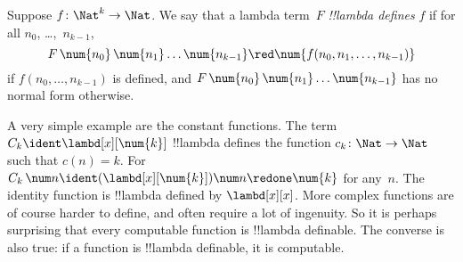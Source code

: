 \documentclass[../../../include/open-logic-section]{subfiles}
\begin{document}
\begin{defn}
Suppose $f\colon \Nat^k \to \Nat$. We say that a lambda term~$F$
\emph{!!{lambda define}s} $f$ if for all 
$n_0$, \dots,~$n_{k-1}$,
\[
F \, \num{n_0} \, \num{n_1} \dots \num{n_{k-1}} \red \num{f(n_0, n_1, \dots,
  n_{k-1})}
\]
if $f(n_0, \dots, n_{k-1})$ is defined, and $F \, \num{n_0} \,
\num{n_1} \dots \num{n_{k-1}}$ has no normal form otherwise.
\end{defn}

A very simple example are the constant functions. The term $C_k \ident
\lambd[x][\num{k}]$ !!{lambda define}s the function $c_k\colon \Nat \to
\Nat$ such that $c(n) = k$. For $C_k \, \num n \ident
(\lambd[x][\num{k}])\num n \redone \num{k}$ for any~$n$. The identity
function is !!{lambda defined} by $\lambd[x][x]$. More complex
functions are of course harder to define, and often require a lot of
ingenuity. So it is perhaps surprising that every computable function
is !!{lambda definable}. The converse is also true: if a function is
!!{lambda definable}, it is computable.
\end{document}
